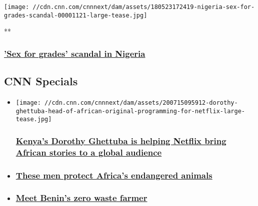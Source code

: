\href{/videos/tv/2018/05/23/nigeria-sex-for-grades-scandal.cnn}{}

\texttt{[image: //cdn.cnn.com/cnnnext/dam/assets/180523172419-nigeria-sex-for-grades-scandal-00001121-large-tease.jpg]}

**

\hypertarget{sex-for-grades-scandal-in-nigeria}{%
\subsubsection{\texorpdfstring{\href{/videos/tv/2018/05/23/nigeria-sex-for-grades-scandal.cnn}{'Sex
for grades' scandal in
Nigeria}}{'Sex for grades' scandal in Nigeria}}\label{sex-for-grades-scandal-in-nigeria}}

\hypertarget{cnn-specials-}{%
\subsection{CNN Specials~}\label{cnn-specials-}}

\begin{itemize}
\item
  \href{/2020/07/16/africa/netflix-africa-dorothy-ghettuba-spc-intl/index.html}{}

  \texttt{[image: //cdn.cnn.com/cnnnext/dam/assets/200715095912-dorothy-ghettuba-head-of-african-original-programming-for-netflix-large-tease.jpg]}

  \hypertarget{-kenyas-dorothy-ghettuba-is-helping-netflix-bring-african-stories-to-a-global-audience}{%
  \subsubsection{\texorpdfstring{\href{/2020/07/16/africa/netflix-africa-dorothy-ghettuba-spc-intl/index.html}{
  Kenya's Dorothy Ghettuba is helping Netflix bring African stories to a
  global
  audience}}{ Kenya's Dorothy Ghettuba is helping Netflix bring African stories to a global audience}}\label{-kenyas-dorothy-ghettuba-is-helping-netflix-bring-african-stories-to-a-global-audience}}
\item
  \hypertarget{these-men-protect-africas-endangered-animals}{%
  \subsubsection{\texorpdfstring{\href{/videos/world/2020/02/14/african-voices-changemakers-animal-protectors-kenya-senegal-diagne-lekilelei.cnn}{These
  men protect Africa's endangered
  animals}}{These men protect Africa's endangered animals}}\label{these-men-protect-africas-endangered-animals}}
\item
  \hypertarget{meet-benins-zero-waste-farmer-}{%
  \subsubsection{\texorpdfstring{\href{/2020/06/24/africa/zero-waste-farming-godfrey-nzamujo-benin-spc-intl/index.html}{Meet
  Benin's zero waste farmer
  }}{Meet Benin's zero waste farmer }}\label{meet-benins-zero-waste-farmer-}}
\end{itemize}


